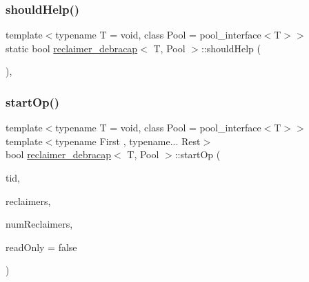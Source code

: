 \mbox{\label{classreclaimer__debracap_a5eb191745230a47bb6ff640dd58e3a11}} 
\subsubsection{\texorpdfstring{should\+Help()}{shouldHelp()}}
{\footnotesize\ttfamily template$<$typename T  = void, class Pool  = pool\+\_\+interface$<$\+T$>$$>$ \\
static bool \hyperlink{classreclaimer__debracap}{reclaimer\+\_\+debracap}$<$ T, Pool $>$\+::should\+Help (\begin{DoxyParamCaption}{ }\end{DoxyParamCaption})\hspace{0.3cm}{\ttfamily [inline]}, {\ttfamily [static]}}

\mbox{\label{classreclaimer__debracap_a2052d4c9d165157e85c75230a3a8e584}} 
\subsubsection{\texorpdfstring{start\+Op()}{startOp()}}
{\footnotesize\ttfamily template$<$typename T  = void, class Pool  = pool\+\_\+interface$<$\+T$>$$>$ \\
template$<$typename First , typename... Rest$>$ \\
bool \hyperlink{classreclaimer__debracap}{reclaimer\+\_\+debracap}$<$ T, Pool $>$\+::start\+Op (\begin{DoxyParamCaption}\item[{const int}]{tid,  }\item[{void $\ast$const $\ast$const}]{reclaimers,  }\item[{const int}]{num\+Reclaimers,  }\item[{const bool}]{read\+Only = {\ttfamily false} }\end{DoxyParamCaption})\hspace{0.3cm}{\ttfamily [inline]}}

\mbox{\label{classreclaimer__debracap_a76838aa9f38af9c481a21e42e6014abc}} 
